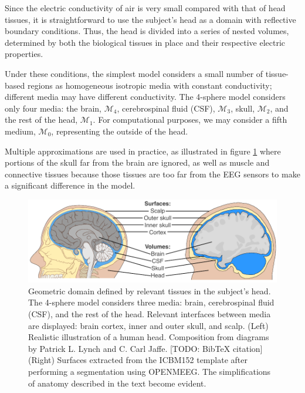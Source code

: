 Since the electric conductivity of air is very small compared with that of head tissues, it is straightforward to use the subject's head as a domain with reflective boundary conditions. 
%
Thus, the head is divided into a series of nested volumes, determined by both the biological tissues in place and their respective electric properties.

Under these conditions, the simplest model considers a small number of tissue-based regions as homogeneous isotropic media with constant conductivity; different media may have different conductivity.
%
The 4-sphere model considers only four media: the brain, $\mathcal{M}_4$, cerebrospinal fluid (CSF), $\mathcal{M}_3$, skull, $\mathcal{M}_2$, and the rest of the head, $\mathcal{M}_1$.
%
For computational purposes, we may consider a fifth medium, $\mathcal{M}_0$, representing the outside of the head.

Multiple approximations are used in practice, as illustrated in figure \ref{fig:diagrams2} where portions of the skull far from the brain are ignored, as well as muscle and connective tissues 
because those tissues are too far from the EEG sensors to make a significant difference in the model.

\begin{figure}
\centering
\includegraphics[width=\linewidth]{./img/HeadSurfacesVolumes}
\caption{Geometric domain defined by relevant tissues in the subject's head. The 4-sphere model considers three media: brain, cerebrospinal fluid (CSF), and the rest of the head. Relevant interfaces between media are displayed: brain cortex, inner and outer skull, and scalp. (Left) Realistic illustration of a human head. Composition from diagrams by Patrick L. Lynch and C. Carl Jaffe. [TODO: BibTeX citation] (Right) Surfaces extracted from the ICBM152 template after performing a segmentation using OPENMEEG. The simplifications of anatomy described in the text become evident.}
\label{fig:diagrams2}
\end{figure}

